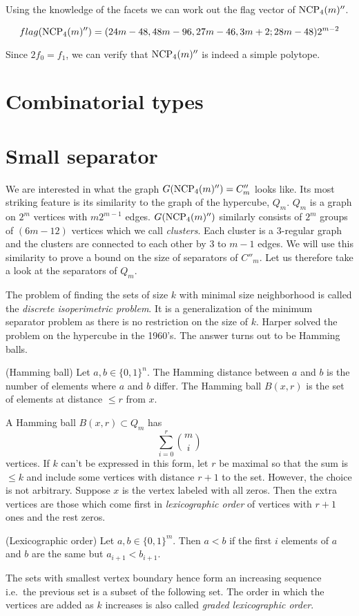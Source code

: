 Using the knowledge of the facets we can work out the flag vector of 
$\textrm{NCP}_4(m)''$.

\begin{equation}
 flag(\textrm{NCP}_4(m)'') = (24m-48, 48m-96, 27m - 46, 3m+2; 28m -48)2^{m-2}
\end{equation}

Since $2f_0 = f_1$, we can verify that $\textrm{NCP}_4(m)''$ is indeed a simple 
polytope.

\section{Combinatorial types}

\section{Small separator}

We are interested in what the graph $G(\textrm{NCP}_4(m)'') = C''_m$ looks like. Its 
most striking feature is its similarity to the graph of the hypercube, $Q_m$. 
$Q_m$ is a graph on $2^m$ vertices with $m2^{m-1}$ edges. $G(\textrm{NCP}_4(m)'')$ 
similarly consists of $2^m$ groups of $(6m-12)$ vertices which we call 
\textit{clusters}. Each cluster is a 3-regular graph and the clusters are 
connected to each other by 3 to $m-1$ edges. We will use this similarity to 
prove a bound on the size of separators of $C''_m$. Let us therefore take a 
look at the separators of $Q_m$.

The problem of finding the sets of size $k$ with minimal size neighborhood is 
called the \textit{discrete isoperimetric problem}. It is a generalization of 
the minimum separator problem as there is no restriction on the size of $k$. 
Harper \cite{Harp} solved the problem on the hypercube in the 1960's. The 
answer turns out to be Hamming balls.

\begin{definition}
 (Hamming ball) Let $a,b \in \{0,1\}^n$. The Hamming distance between $a$ and 
$b$ is the number of elements where $a$ and $b$ differ. The Hamming ball 
$B(x,r)$ is the set of elements at distance $\leq r$ from $x$.
\end{definition}

A Hamming ball $B(x,r) \subset Q_m$ has 
\begin{equation}
 \sum_{i=0}^r {m \choose i}
\end{equation}
vertices. If $k$ can't be expressed in this form, let $r$ be maximal so that 
the sum is $\leq k$ and include some vertices with distance $r+1$ to the set. 
However, the choice is not arbitrary. Suppose $x$ is the vertex labeled with 
all zeros. Then the extra vertices are those which come first in 
\textit{lexicographic order} of vertices with $r+1$ ones and the rest zeros.
\begin{definition}
 (Lexicographic order) Let $a,b \in \{0,1\}^m$. Then $a<b$ if the first $i$ 
elements of $a$ and $b$ are the same but $a_{i+1} < b_{i+1}$.
\end{definition}
The sets with smallest vertex boundary hence form an increasing sequence i.e.\ 
the previous set is a subset of the following set. The order in which the 
vertices are added as $k$ increases is also called \textit{graded lexicographic 
order}.

